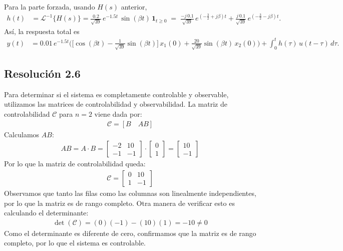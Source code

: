 \documentclass[
  11pt,
  letterpaper,
   addpoints,
   answers
  ]{exam}
\begin{document}
\begin{solution}
Para la parte forzada, usando $H(s)$ anterior,
\begin{align}
h(t)
&=\mathcal{L}^{-1}\!\{H(s)\}
=\frac{0.2}{\sqrt{39}}\,e^{-1.5t}\,\sin(\beta t)\,\mathbf{1}_{t\ge 0}
\;=\;\frac{-j\,0.1}{\sqrt{39}}\,e^{(-\frac{3}{2}+j\beta)t}
+\frac{j\,0.1}{\sqrt{39}}\,e^{(-\frac{3}{2}-j\beta)t}.
\end{align}
Así, la respuesta total es
\begin{align}
y(t)
&=0.01\,e^{-1.5t}
\Bigg(
\Big[\cos(\beta t)-\frac{1}{\sqrt{39}}\sin(\beta t)\Big]\,x_1(0)
+\frac{20}{\sqrt{39}}\sin(\beta t)\,x_2(0)
\Bigg)
+\int_{0}^{t} h(\tau)\,u(t-\tau)\,d\tau .
\end{align}

\subsection*{Resolución 2.6}
Para determinar si el sistema es completamente controlable y observable, utilizamos las matrices de controlabilidad y observabilidad. La matriz de controlabilidad $\mathcal{C}$ para $n=2$ viene dada por:
\begin{align}
\mathcal{C} = [B \quad AB]
\end{align}
Calculamos $AB$:
\begin{align}
AB = A \cdot B = \begin{bmatrix} -2 & 10
\\ -1 & -1 \end{bmatrix} \cdot \begin{bmatrix} 0 \\ 1 \end{bmatrix} = \begin{bmatrix} 10 \\ -1 \end{bmatrix}
\end{align}
Por lo que la matriz de controlabilidad queda:
\begin{align}
\mathcal{C} = \begin{bmatrix} 0 & 10 \\ 1 & -1 \end{bmatrix}
\end{align}
Observamos que tanto las filas como las columnas son linealmente independientes, por lo que la matriz es de rango completo. Otra manera de verificar esto es calculando el determinante:
\begin{align}
\det(\mathcal{C}) = (0)(-1) - (10)(1) = -10 \neq 0
\end{align}
Como el determinante es diferente de cero, confirmamos que la matriz es de rango completo, por lo que el sistema es controlable. 


\end{solution}
\end{document}
